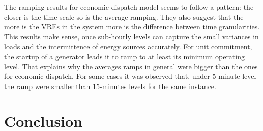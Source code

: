 \documentclass[12pt,LUDisStyle,twosided]{book}
\begin{document}
The ramping results for economic dispatch model seems to follow a pattern: the closer is the time scale so is the average ramping. They also suggest that the more is the VREs in the system more is the difference between time granularities. This results make sense, once sub-hourly levels can capture the small variances in loads and the intermittence of energy sources accurately. For unit commitment, the startup of a generator leads it to ramp to at least its minimum operating level. That explains why the averages ramps in general were bigger than the ones for economic dispatch. For some cases it was observed that, under 5-minute level the ramp were smaller than 15-minutes levels for the same instance. 


\chapter{Conclusion}

\appendix



\nocite{*}


\end{document}
